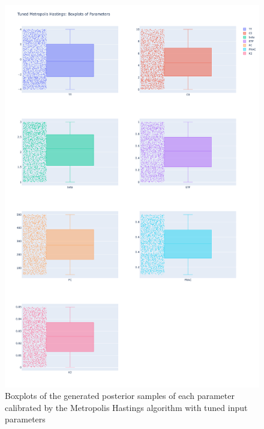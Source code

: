 \begin{figure}
    \centering
    \includegraphics[width=1\textwidth]{figures/basic_mh/tuned_mh/tuned_mh_boxplot.png}
    \captionsetup{width=.8\textwidth}
    \caption{Boxplots of the generated posterior samples of each parameter calibrated by the Metropolis Hastings algorithm with tuned input parameters}
    \label{fig:enter-label}
\end{figure}



